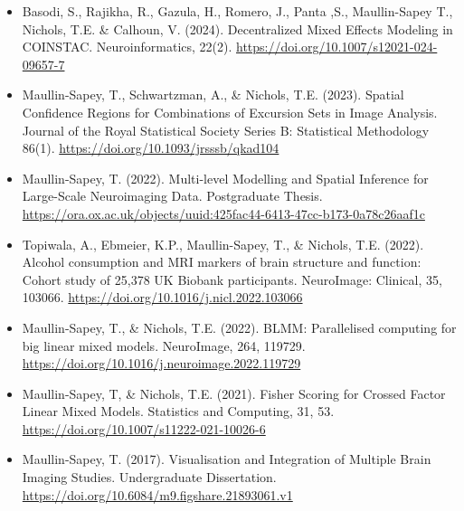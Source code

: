 \documentclass{friggeri-cv}
\begin{document}
{\begin{itemize}
    \item Basodi, S., Rajikha, R., Gazula, H., Romero, J., Panta ,S., Maullin-Sapey T., Nichols, T.E. \& Calhoun, V. (2024). Decentralized Mixed Effects Modeling in COINSTAC. Neuroinformatics, 22(2). \url{https://doi.org/10.1007/s12021-024-09657-7}
    \item Maullin-Sapey, T., Schwartzman, A., \& Nichols, T.E. (2023). Spatial Confidence Regions for Combinations of Excursion Sets in Image Analysis. Journal of the Royal Statistical Society Series B: Statistical Methodology 86(1). \url{https://doi.org/10.1093/jrsssb/qkad104}
    \item Maullin-Sapey, T. (2022). Multi-level Modelling and Spatial Inference for Large-Scale Neuroimaging Data. Postgraduate Thesis. \url{https://ora.ox.ac.uk/objects/uuid:425fac44-6413-47cc-b173-0a78c26aaf1c}
    \item Topiwala, A., Ebmeier, K.P., Maullin-Sapey, T., \& Nichols, T.E. (2022). Alcohol consumption and MRI markers of brain structure and function: Cohort study of 25,378 UK Biobank participants. NeuroImage: Clinical, 35, 103066. \url{https://doi.org/10.1016/j.nicl.2022.103066}
    \item Maullin-Sapey, T., \& Nichols, T.E. (2022). BLMM: Parallelised computing for big linear mixed models. NeuroImage, 264, 119729. \url{https://doi.org/10.1016/j.neuroimage.2022.119729}
    \item Maullin-Sapey, T, \& Nichols, T.E. (2021). Fisher Scoring for Crossed Factor Linear Mixed Models. Statistics and Computing, 31, 53. \url{https://doi.org/10.1007/s11222-021-10026-6}
    \item Maullin-Sapey, T. (2017). Visualisation and Integration of Multiple Brain Imaging Studies. Undergraduate Dissertation. \url{https://doi.org/10.6084/m9.figshare.21893061.v1}
\end{itemize}
}
\normalsize
\end{document}
